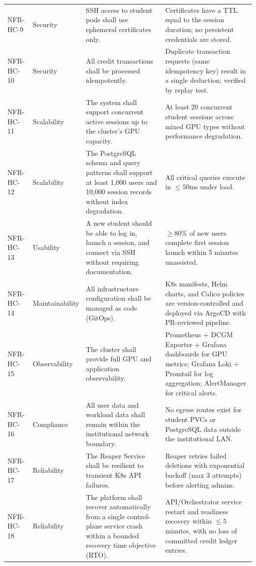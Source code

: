 \documentclass[12pt,a4paper]{article}
\begin{document}
\begin{longtable}{@{}L{2.4cm}L{2.5cm}L{5.3cm}L{4.5cm}@{}}
  NFR-HC-9 & Security & SSH access to student pods shall use ephemeral certificates only. & Certificates have a TTL equal to the session duration; no persistent credentials are stored. \\
    NFR-HC-10 & Security & All credit transactions shall be processed idempotently. & Duplicate transaction requests (same idempotency key) result in a single deduction; verified by replay test. \\
  NFR-HC-11 & Scalability & The system shall support concurrent active sessions up to the cluster's GPU capacity. & At least 20 concurrent student sessions across mixed GPU types without performance degradation. \\
    NFR-HC-12 & Scalability & The PostgreSQL schema and query patterns shall support at least 1,000 users and 10,000 session records without index degradation. & All critical queries execute in $\leq 50$ms under load. \\
  NFR-HC-13 & Usability & A new student should be able to log in, launch a session, and connect via SSH without requiring documentation. & $\geq 80\%$ of new users complete first session launch within 5 minutes unassisted. \\
    NFR-HC-14 & Maintainability & All infrastructure configuration shall be managed as code (GitOps). & K8s manifests, Helm charts, and Calico policies are version-controlled and deployed via ArgoCD with PR-reviewed pipeline. \\
  NFR-HC-15 & Observability & The cluster shall provide full GPU and application observability. & Prometheus + DCGM Exporter + Grafana dashboards for GPU metrics; Grafana Loki + Promtail for log aggregation; AlertManager for critical alerts. \\
    NFR-HC-16 & Compliance & All user data and workload data shall remain within the institutional network boundary. & No egress routes exist for student PVCs or PostgreSQL data outside the institutional LAN. \\
  NFR-HC-17 & Reliability & The Reaper Service shall be resilient to transient K8s API failures. & Reaper retries failed deletions with exponential backoff (max 3 attempts) before alerting admins. \\
    NFR-HC-18 & Reliability & The platform shall recover automatically from a single control-plane service crash within a bounded recovery time objective (RTO). & API/Orchestrator service restart and readiness recovery within $\leq 5$ minutes, with no loss of committed credit ledger entries. \\

\end{longtable}
\end{document}
